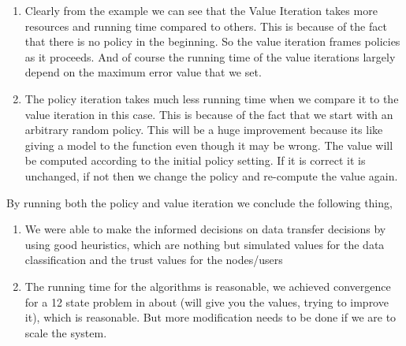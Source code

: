 \begin{enumerate}
    \item Clearly from the example we can see that the Value Iteration takes
more resources and running time compared to others. This is because of the fact
that there is no policy in the beginning. So the value iteration frames policies
as it proceeds. And of course the running time of the value iterations largely
depend on the maximum error value that we set.
    \item The policy iteration takes much less running time when we compare it to the
value iteration in this case. This is because of the fact that we start with an
arbitrary random policy. This will be a huge improvement because its like giving
a model to the function even though it may be wrong. The value will be computed
according to the initial policy setting. If it is correct it is unchanged, if
not then we change the policy and re-compute the value again.
\end{enumerate}
By running both the policy and value iteration we conclude the following thing,
\begin{enumerate}
    \item We were able to make the informed decisions on data transfer decisions by
using good heuristics, which are nothing but simulated values for the data
classification and the trust values for the nodes/users
    \item The running time for
the algorithms is reasonable, we achieved convergence for a 12 state problem in
about (will give you the values, trying to improve it), which is reasonable. But
more modification needs to be done if we are to scale the system.
\end{enumerate}
